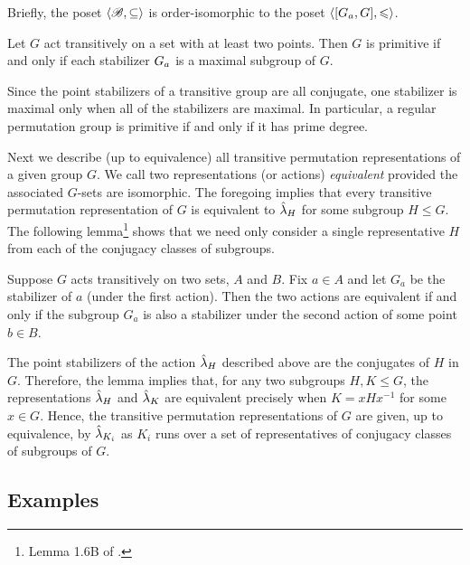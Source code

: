 Briefly, the poset $\langle\mathscr{B}, \subseteq\rangle$ is order-isomorphic to the 
poset $\langle[G_{a},G], \leqslant\rangle$. 

\begin{corollary}
  Let $G$ act transitively on a set with at least two
  points. 
  Then $G$ is primitive if and only if each stabilizer $G_{a}$ is a
  maximal subgroup of $G$.
\end{corollary}

Since the point stabilizers of a transitive group are all conjugate, 
one stabilizer is maximal only when all of the stabilizers are maximal. 
In particular, a regular permutation group is primitive if and only if it has
prime degree. 

Next we describe (up to equivalence) all transitive permutation
representations of a given group $G$.  
We call two representations (or actions) 
%
\emph{equivalent}
provided the associated $G$-sets are isomorphic. 
The foregoing implies that every transitive permutation representation of $G$ is
equivalent to $\hat{\lambda}_H$ for some subgroup $H \leq G$.  The following
lemma\footnote{Lemma 1.6B of \cite{Dixon:1996}.} 
shows that we need only consider a single representative $H$ from each of the
conjugacy classes of subgroups.  

\begin{lemma}
  Suppose $G$ acts transitively on two sets,
  $A$ and $B$.  Fix $a\in A$ and let $G_a$ be the stabilizer of $a$ (under the first
  action).  Then the two actions are equivalent
  if and only if the subgroup $G_a$ is also a stabilizer under the second action
  of some point $b\in B$. 
\end{lemma}

The point stabilizers of the action $\hat{\lambda}_H$ described above are the
conjugates of $H$ in $G$.  Therefore, the lemma implies that, for any two
subgroups $H, K \leq G$, the representations $\hat{\lambda}_H$ and $\hat{\lambda}_K$ are
equivalent precisely when $K = x Hx^{-1}$ for some $x\in G$. 
Hence, the transitive permutation representations of $G$ are given, up to
equivalence, by $\hat{\lambda}_{K_i}$ as $K_i$ runs over a set of representatives of
conjugacy classes of subgroups of $G$.   


\subsection{Examples}

